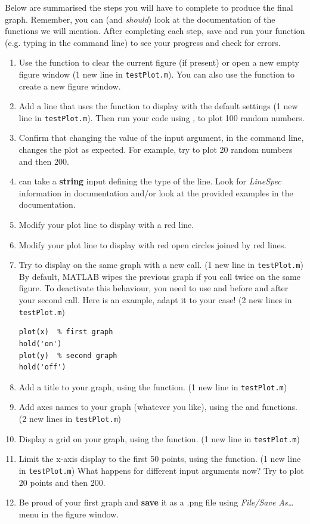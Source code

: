 \documentclass{article}
\begin{document}
Below are summarised the steps you will have to complete to produce the final graph.
Remember, you can (and \emph{should}) look at the documentation of the functions we will mention.
After completing each step, save and run your function (e.g. typing  in the command line) to see your progress and check for errors.
\begin{enumerate}
  \item Use the  function to clear the current figure (if present) or open a new empty figure window (1 new line in \texttt{testPlot.m}).
    You can also use the  function to create a new figure window.
  \item Add a line that uses the  function to display  with the default settings (1 new line in \texttt{testPlot.m}).
    Then run your code using , to plot 100 random numbers.
  \item Confirm that changing the value of the input argument, in the command line, changes the plot as expected.
    For example, try to plot 20 random numbers and then 200.
  \item {} can take a \textbf{string} input defining the type of the line.
    Look for \emph{LineSpec} information in  documentation and/or look at the provided examples in the documentation.
  \item Modify your plot line to display  with a red line.
  \item Modify your plot line to display  with red open circles joined by red lines.
  \item Try to display  on the same graph with a new  call. (1 new line in \texttt{testPlot.m})\\
    By default, MATLAB wipes the previous graph if you call  twice on the same figure.
    To deactivate this behaviour, you need to use  and  before and after your second  call.
    Here is an example, adapt it to your case! (2 new lines in \texttt{testPlot.m})
\begin{lstlisting}
plot(x)  % first graph
hold('on')
plot(y)  % second graph
hold('off')
\end{lstlisting}
  \item Add a title to your graph, using the  function. (1 new line in \texttt{testPlot.m})
  \item Add axes names to your graph (whatever you like), using the  and  functions. (2 new lines in \texttt{testPlot.m})
  \item Display a grid on your graph, using the  function. (1 new line in \texttt{testPlot.m})
  \item Limit the x-axis display to the first 50 points, using the  function. (1 new line in \texttt{testPlot.m})
    What happens for different input arguments now? Try to plot 20 points and then 200.
  \item Be proud of your first graph and \textbf{save} it as a .png file using \emph{File/Save As\dots} menu in the figure window.
\end{enumerate}
\end{document}
